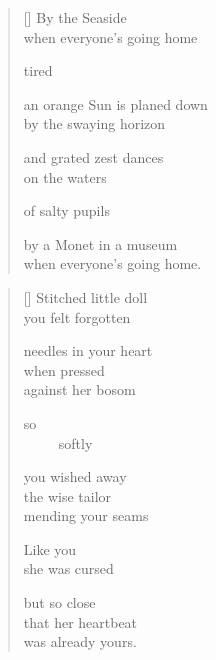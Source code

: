 \documentclass[14pt]{extbook}
\newcommand*{\centeredornament}{\centerline{\pgfornament[width=6cm]{88}}}
\begin{document}

\newpage

\vspace*{-15mm}
\centeredornament
\vspace*{-7mm}


\settowidth{\versewidth}{an orange Sun is planed down}

\begin{verse}[\versewidth]
  By the Seaside \\
  when everyone's going home

  tired

  an orange Sun is planed down \\
  by the swaying horizon

  and grated zest dances \\
  on the waters

  of salty pupils

  by a Monet in a museum \\
  when everyone's going home.
\end{verse}


\newpage

\vspace*{-15mm}
\centeredornament
\vspace*{-7mm}


\settowidth{\versewidth}{needles in your heart}

\begin{verse}[\versewidth]
  Stitched little doll \\
  you felt forgotten

  needles in your heart \\
  when pressed \\
  against her bosom

  so \\
  \ \ \ \ \ softly

  you wished away \\
  the wise tailor \\
  mending your seams

  Like you \\
  she was cursed

  but so close \\
  that her heartbeat \\
  was already yours.
\end{verse}
\end{document}
